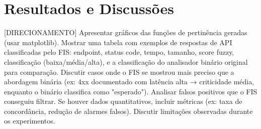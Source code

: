 \section{Resultados e Discussões}

[DIRECIONAMENTO] Apresentar gráficos das funções de pertinência geradas (usar matplotlib). Mostrar uma tabela com exemplos de respostas de API classificadas pelo FIS: endpoint, status code, tempo, tamanho, score fuzzy, classificação (baixa/média/alta), e a classificação do analisador binário original para comparação. Discutir casos onde o FIS se mostrou mais preciso que a abordagem binária (ex: 4xx documentado com latência alta → criticidade média, enquanto o binário classifica como "esperado"). Analisar falsos positivos que o FIS conseguiu filtrar. Se houver dados quantitativos, incluir métricas (ex: taxa de concordância, redução de alarmes falsos). Discutir limitações observadas durante os experimentos.
\endinput
